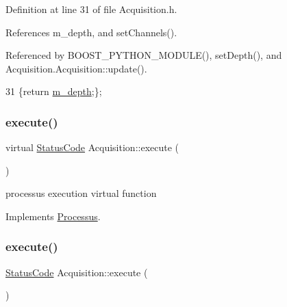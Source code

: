 Definition at line 31 of file Acquisition.\+h.



References m\+\_\+depth, and set\+Channels().



Referenced by B\+O\+O\+S\+T\+\_\+\+P\+Y\+T\+H\+O\+N\+\_\+\+M\+O\+D\+U\+L\+E(), set\+Depth(), and Acquisition.\+Acquisition\+::update().


\begin{DoxyCode}
31 \{\textcolor{keywordflow}{return} \hyperlink{classAcquisition_a26628424533a2dd74d24712a14637a72}{m\_depth};\};
\end{DoxyCode}
\mbox{\label{classAcquisition_a6cae797f591c2c576ebf17411e5212c9}} 
\subsubsection{\texorpdfstring{execute()}{execute()}\hspace{0.1cm}{\footnotesize\ttfamily [1/2]}}
{\footnotesize\ttfamily virtual \hyperlink{classStatusCode}{Status\+Code} Acquisition\+::execute (\begin{DoxyParamCaption}{ }\end{DoxyParamCaption})\hspace{0.3cm}{\ttfamily [virtual]}}

processus execution virtual function 

Implements \hyperlink{classProcessus_a63767a63a1fb0055c5aa45b21a4a5d58}{Processus}.

\mbox{\label{classAcquisition_ae3b63064bee1b042914b63ae4135cbd8}} 
\subsubsection{\texorpdfstring{execute()}{execute()}\hspace{0.1cm}{\footnotesize\ttfamily [2/2]}}
{\footnotesize\ttfamily \hyperlink{classStatusCode}{Status\+Code} Acquisition\+::execute (\begin{DoxyParamCaption}{ }\end{DoxyParamCaption})\hspace{0.3cm}{\ttfamily [virtual]}}

